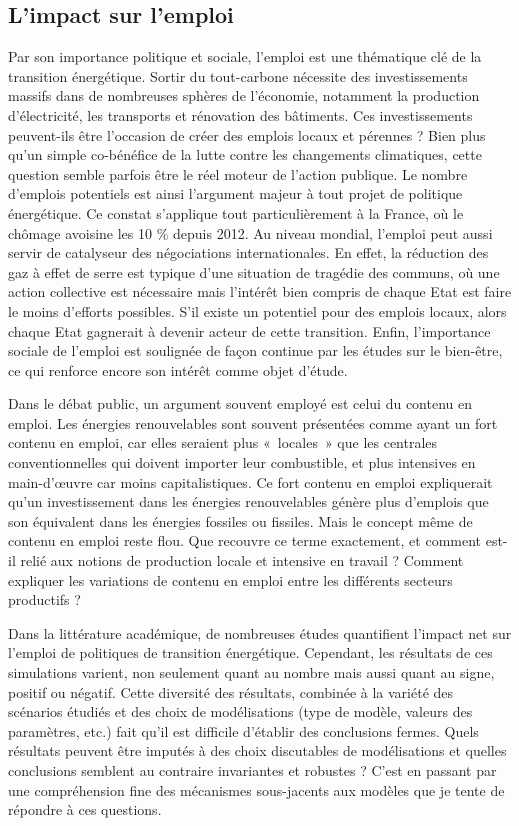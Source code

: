 \subsection{L'impact sur l'emploi}
Par son importance politique et sociale, l'emploi est une thématique clé de la transition énergétique. Sortir du tout-carbone nécessite des investissements massifs dans de nombreuses sphères de l'économie, notamment la production d'électricité, les transports et rénovation des bâtiments. Ces investissements peuvent-ils être l'occasion de créer des emplois locaux et pérennes ?
Bien plus qu'un simple co-bénéfice de la lutte contre les changements climatiques, cette question semble parfois être le réel moteur de l'action publique. Le nombre d'emplois potentiels est ainsi l'argument majeur à tout projet de politique énergétique. Ce constat s'applique tout particulièrement à la France, où le chômage avoisine les 10 \% depuis 2012.
Au niveau mondial, l'emploi peut aussi servir de catalyseur des négociations internationales. En effet, la réduction des gaz à effet de serre est typique d'une situation de tragédie des communs, où une action collective est nécessaire mais l'intérêt bien compris de chaque Etat est faire le moins d'efforts possibles. S'il existe un potentiel pour des emplois locaux, alors chaque Etat gagnerait à devenir acteur de cette transition. 
Enfin, l'importance sociale de l'emploi est soulignée de façon continue par les études sur le bien-être, ce qui renforce encore son intérêt comme objet d'étude.

Dans le débat public, un argument souvent employé est celui du contenu en emploi. Les énergies renouvelables sont souvent présentées comme ayant un fort contenu en emploi, car elles seraient plus «~locales~» que les centrales conventionnelles qui doivent importer leur combustible, et plus intensives en main-d'\oe{}uvre car moins capitalistiques. Ce fort contenu en emploi expliquerait qu'un investissement dans les énergies renouvelables génère plus d'emplois que son équivalent dans les énergies fossiles ou fissiles. Mais le concept même de contenu en emploi reste flou. Que recouvre ce terme exactement, et comment est-il relié aux notions de production locale et intensive en travail ? Comment expliquer les variations de contenu en emploi entre les différents secteurs productifs ?

Dans la littérature académique, de nombreuses études quantifient l'impact net sur l'emploi de politiques de transition énergétique. Cependant, les résultats de ces simulations varient, non seulement quant au nombre mais aussi quant au signe, positif ou négatif. Cette diversité des résultats, combinée à la variété des scénarios étudiés et des choix de modélisations (type de modèle, valeurs des paramètres, etc.) fait qu'il est difficile d'établir des conclusions fermes. 
Quels résultats peuvent être imputés à des choix discutables de modélisations et quelles conclusions semblent au contraire invariantes et robustes ? C'est en passant par une compréhension fine des mécanismes sous-jacents aux modèles que je tente de répondre à ces questions.

